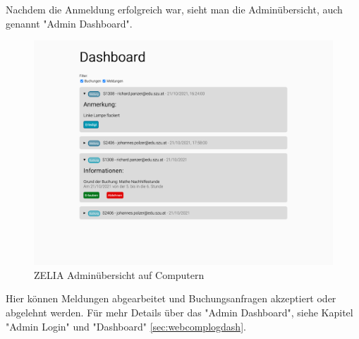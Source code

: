 Nachdem die Anmeldung erfolgreich war, sieht man die Adminübersicht, auch genannt "Admin Dashboard". 

\begin{figure}[H]
    \centering
    \includegraphics[width=120mm]{media/WebComponents/AdminSeite_light.png}
    \caption{ZELIA Adminübersicht auf Computern}
\end{figure}

Hier können Meldungen abgearbeitet und Buchungsanfragen akzeptiert oder abgelehnt werden.
Für mehr Details über das "Admin Dashboard", siehe Kapitel "Admin Login" und "Dashboard" \ref{sec:webcomplogdash}.
